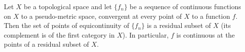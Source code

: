 Let $X$ be a topological space and let $\{f_n\}$ be a sequence of continuous functions on $X$ to a pseudo-metric space, convergent at every point of $X$ to a function $f$. Then the set of points of equicontinuity of $\{f_n\}$ is a residual subset of $X$ (its complement is of the first category in $X$). In particular, $f$ is continuous at the points of a residual subset of $X$.
